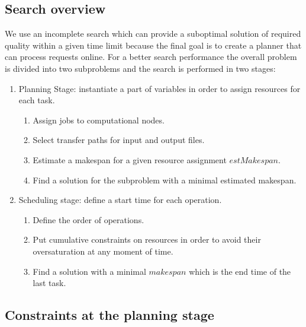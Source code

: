 \documentclass[english]{ddny}
\begin{document}
\subsection{Search overview}
We use an incomplete search which can provide a suboptimal solution of required quality within a given time limit because the final goal is to create a planner that can process requests online.
For a better search performance the overall problem is divided into two subproblems and the search is performed in two stages: 
\begin{enumerate}
\item Planning Stage: instantiate a part of variables in order to assign resources for each task.     
	\begin{enumerate}
	\item Assign jobs to computational nodes. 
	\item Select transfer paths for input and output files. 
	\item Estimate a makespan for a given resource assignment $estMakespan$.
	\item Find a solution for the subproblem with a minimal estimated makespan. 
	\end{enumerate}
\item Scheduling stage: define a start time for each operation. 
	\begin{enumerate}
	\item Define the order of operations. 
	\item Put cumulative constraints on resources in order to avoid their oversaturation at any moment of time.
	\item Find a solution with a minimal $makespan$ which is the end time of the last task. 
	\end{enumerate}
\end{enumerate}

\subsection{Constraints at the planning stage}
\end{document}
